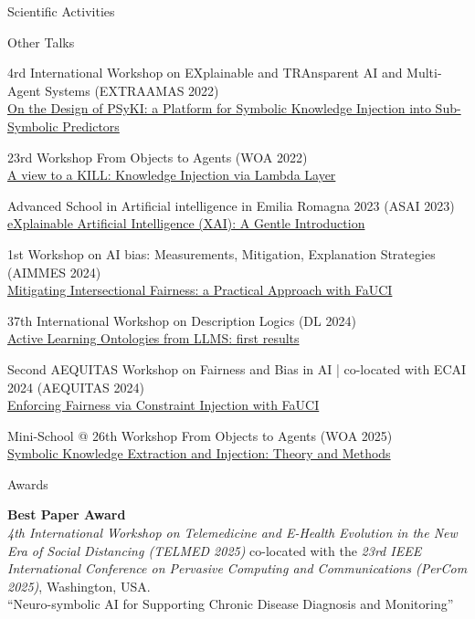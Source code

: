 \documentclass{resume} %
\begin{document}
\begin{rSection}{Scientific Activities}
        \begin{rSubsection2}{Other Talks}
            \item 4rd International Workshop on EXplainable and TRAnsparent AI and Multi-Agent Systems (EXTRAAMAS 2022)
            \\\href{https://apice.unibo.it/xwiki/bin/view/Talk/PsykiExtraamas2022}{On the Design of PSyKI: a Platform for Symbolic Knowledge Injection into Sub-Symbolic Predictors}
            \item 23rd Workshop From Objects to Agents (WOA 2022)
            \\\href{https://apice.unibo.it/xwiki/bin/view/Talk/KillWoa2022}{A view to a KILL: Knowledge Injection via Lambda Layer}
            \item Advanced School in Artificial intelligence in Emilia Romagna 2023 (ASAI 2023)
            \\\href{https://apice.unibo.it/xwiki/bin/view/Talk/XaiAsaiErBertinoro2023}{eXplainable Artificial Intelligence (XAI): A Gentle Introduction}
            \item 1st Workshop on AI bias: Measurements, Mitigation, Explanation Strategies (AIMMES 2024)
            \\\href{https://apice.unibo.it/xwiki/bin/view/Talk/IntersectionalityAimmes2024}{Mitigating Intersectional Fairness: a Practical Approach with FaUCI}
            \item 37th International Workshop on Description Logics (DL 2024)
            \\\href{https://dl2024.w.uib.no/overview/}{Active Learning Ontologies from LLMS: first results}
            \item Second AEQUITAS Workshop on Fairness and Bias in AI | co-located with ECAI 2024 (AEQUITAS 2024)
            \\\href{https://apice.unibo.it/xwiki/bin/view/Talk/FauciAequitas2024}{Enforcing Fairness via Constraint Injection with FaUCI}
            \item Mini-School @ 26th Workshop From Objects to Agents (WOA 2025)
            \\\href{https://sites.google.com/view/woa2025/mini-school?}{Symbolic Knowledge Extraction and Injection: Theory and Methods}
        \end{rSubsection2}


        \begin{rSubsection2}{Awards}
            \item \textbf{Best Paper Award}
            \\
            \textit{4th International Workshop on Telemedicine and E-Health Evolution in the New Era of Social Distancing (TELMED 2025)} co-located with the \textit{23rd IEEE International Conference on Pervasive Computing and Communications (PerCom 2025)}, Washington, USA.
            \\
            ``Neuro-symbolic AI for Supporting Chronic Disease Diagnosis and Monitoring''


\end{rSubsection2}
\end{rSection}
\end{document}
